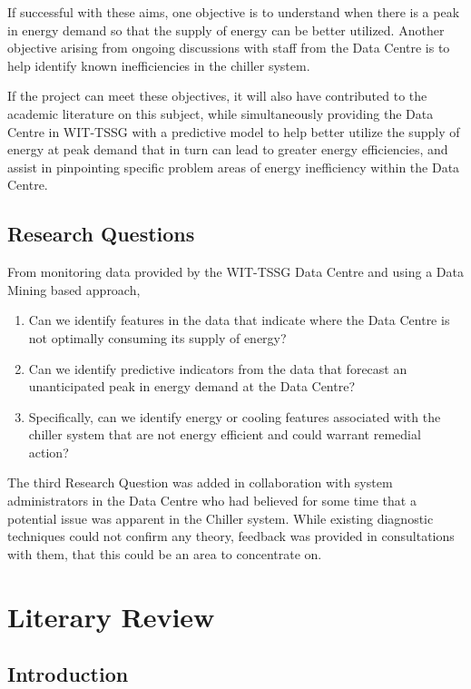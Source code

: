 \documentclass[12pt]{scrartcl}
\begin{document}
If successful with these aims, one objective is to understand when there is a peak in energy demand so that the supply of energy can be better utilized. Another objective arising from ongoing discussions with staff from the Data Centre is to help identify known inefficiencies in the chiller system.  

If the project can meet these objectives, it will also have contributed to the academic literature on this subject, while simultaneously providing the Data Centre in WIT-TSSG with a predictive model to help better utilize the supply of energy at peak demand that in turn can lead to greater energy efficiencies, and assist in pinpointing specific problem areas of energy inefficiency within the Data Centre. 
 

\subsection{Research Questions}
\label{subsec:[Research Questions]}

From monitoring data provided by the WIT-TSSG Data Centre and using a Data Mining based approach,
\begin{enumerate}
  \item Can we identify features in the data that indicate where the Data Centre is not optimally consuming its supply of energy?
    \item Can we identify predictive indicators from the data that forecast an unanticipated peak in energy demand at the Data Centre?
  \item Specifically, can we identify energy or cooling features associated with the chiller system that are not energy efficient and could warrant remedial action?  


\end{enumerate}

The third Research Question was added in collaboration with system administrators in the Data Centre who had believed for some time that a potential issue was apparent in the Chiller system. While existing diagnostic techniques could not confirm any theory, feedback was provided in consultations with them, that this could be an area to concentrate on.      

\section{Literary Review}
\label{sec:[Literary Review]}

\subsection{Introduction}
\label{subsec:[Introduction]}
\end{document}

